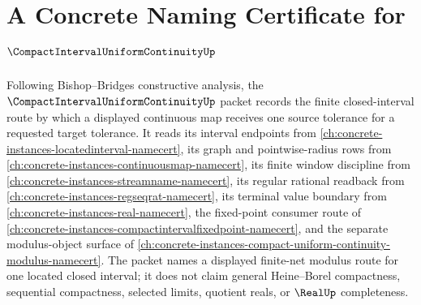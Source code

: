 \chapter{A Concrete Naming Certificate for $\CompactIntervalUniformContinuityUp$}
\label{ch:concrete-instances-compact-interval-uniform-continuity-namecert}

Following Bishop--Bridges constructive analysis, the
$\CompactIntervalUniformContinuityUp$ packet records the finite closed-interval
route by which a displayed continuous map receives one source tolerance for a
requested target tolerance. It reads its interval endpoints from
\autoref{ch:concrete-instances-locatedinterval-namecert}, its graph and
pointwise-radius rows from \autoref{ch:concrete-instances-continuousmap-namecert},
its finite window discipline from \autoref{ch:concrete-instances-streamname-namecert},
its regular rational readback from \autoref{ch:concrete-instances-regseqrat-namecert},
its terminal value boundary from \autoref{ch:concrete-instances-real-namecert},
the fixed-point consumer route of
\autoref{ch:concrete-instances-compactintervalfixedpoint-namecert}, and the
separate modulus-object surface of
\autoref{ch:concrete-instances-compact-uniform-continuity-modulus-namecert}.
The packet names a displayed finite-net modulus route for one located closed
interval; it does not claim general Heine--Borel compactness, sequential
compactness, selected limits, quotient reals, or $\RealUp$ completeness.

